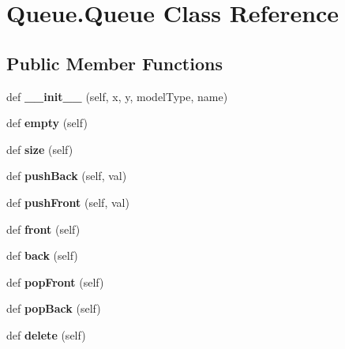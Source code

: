 \hypertarget{class_queue_1_1_queue}{}\section{Queue.\+Queue Class Reference}
\label{class_queue_1_1_queue}
\subsection*{Public Member Functions}
\begin{DoxyCompactItemize}
\item 
\mbox{\label{class_queue_1_1_queue_a775357405d27ad4bdf5ed097bee49665}} 
def {\bfseries \+\_\+\+\_\+init\+\_\+\+\_\+} (self, x, y, model\+Type, name)
\item 
\mbox{\label{class_queue_1_1_queue_a1472c6353f40c911d09da436ce8b2baa}} 
def {\bfseries empty} (self)
\item 
\mbox{\label{class_queue_1_1_queue_a478b93022acfd9225f15868f5eda0410}} 
def {\bfseries size} (self)
\item 
\mbox{\label{class_queue_1_1_queue_a6333268eb174c6fda6f9574e951710b2}} 
def {\bfseries push\+Back} (self, val)
\item 
\mbox{\label{class_queue_1_1_queue_a17b55e82b5a8db529ff6a23a6b14bb03}} 
def {\bfseries push\+Front} (self, val)
\item 
\mbox{\label{class_queue_1_1_queue_a7d3ec12e83314c6a109e8403b9250c30}} 
def {\bfseries front} (self)
\item 
\mbox{\label{class_queue_1_1_queue_ab49a295f4ebc449e5830119085493614}} 
def {\bfseries back} (self)
\item 
\mbox{\label{class_queue_1_1_queue_aa2cd3a51ee6600ca226f7c43623d6ede}} 
def {\bfseries pop\+Front} (self)
\item 
\mbox{\label{class_queue_1_1_queue_a192c71ff5839f8b1970976eefaaec777}} 
def {\bfseries pop\+Back} (self)
\item 
\mbox{\label{class_queue_1_1_queue_ac384b9efaf5e8d9b1b7a34183062468c}} 
def {\bfseries delete} (self)
\end{DoxyCompactItemize}
